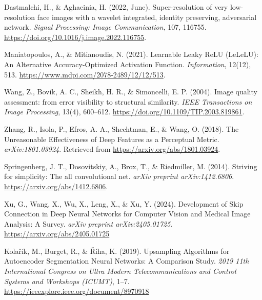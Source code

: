 \documentclass[twocolumn]{article}
\begin{document}
\begin{thebibliography}{99}
     Dastmalchi, H., \& Aghaeinia, H. (2022, June). Super-resolution of very low-resolution face images with a wavelet integrated, identity preserving, adversarial network. \textit{Signal Processing: Image Communication}, 107, 116755. \url{https://doi.org/10.1016/j.image.2022.116755}.
    
     Maniatopoulos, A., \& Mitianoudis, N. (2021). Learnable Leaky ReLU (LeLeLU): An Alternative Accuracy-Optimized Activation Function. \textit{Information}, 12(12), 513. \url{https://www.mdpi.com/2078-2489/12/12/513}.
    
     Wang, Z., Bovik, A. C., Sheikh, H. R., \& Simoncelli, E. P. (2004). Image quality assessment: from error visibility to structural similarity. \textit{IEEE Transactions on Image Processing}, 13(4), 600–612. \url{https://doi.org/10.1109/TIP.2003.819861}.
    
     Zhang, R., Isola, P., Efros, A. A., Shechtman, E., \& Wang, O. (2018). The Unreasonable Effectiveness of Deep Features as a Perceptual Metric. \textit{arXiv:1801.03924}. Retrieved from \url{https://arxiv.org/abs/1801.03924}.

     Springenberg, J. T., Dosovitskiy, A., Brox, T., \& Riedmiller, M. (2014). Striving for simplicity: The all convolutional net. \textit{arXiv preprint arXiv:1412.6806}. \url{https://arxiv.org/abs/1412.6806}.
  
     Xu, G., Wang, X., Wu, X., Leng, X., \& Xu, Y. (2024). Development of Skip Connection in Deep Neural Networks for Computer Vision and Medical Image Analysis: A Survey. \textit{arXiv preprint arXiv:2405.01725}. \url{https://arxiv.org/abs/2405.01725}

     Kolařík, M., Burget, R., \& Říha, K. (2019). Upsampling Algorithms for Autoencoder Segmentation Neural Networks: A Comparison Study. \textit{2019 11th International Congress on Ultra Modern Telecommunications and Control Systems and Workshops (ICUMT)}, 1–7. \url{https://ieeexplore.ieee.org/document/8970918}

  \end{thebibliography}
\end{document}
